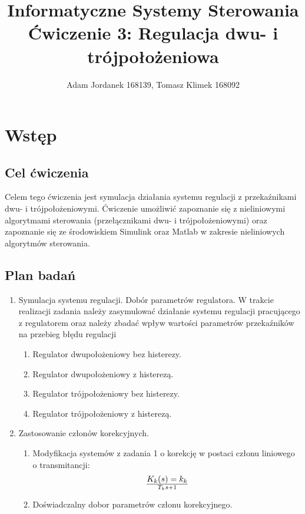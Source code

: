 \documentclass[a4paper,10pt]{article}
\title{Informatyczne Systemy Sterowania \\ \large Ćwiczenie 3: Regulacja dwu- i trójpołożeniowa}
\author{Adam Jordanek 168139, Tomasz Klimek 168092}
\begin{document}
\maketitle

\section{Wstęp}\label{sec:wstęp}
\subsection{Cel ćwiczenia}
Celem tego ćwiczenia jest symulacja działania systemu regulacji z przekaźnikami dwu- i trójpołożeniowymi. Ćwiczenie umożliwić zapoznanie się z nieliniowymi algorytmami sterowania (przełącznikami dwu- i trójpołożeniowymi) oraz zapoznanie się ze środowiskiem Simulink oraz Matlab w zakresie nieliniowych algorytmów sterowania.

\subsection{Plan badań} 
\begin{enumerate}
	\item Symulacja systemu regulacji. Dobór parametrów regulatora. \newline
	 \small {W trakcie realizacji zadania należy zasymulować działanie systemu regulacji pracującego z regulatorem oraz należy zbadać wpływ wartości parametrów przekaźników na przebieg błędu regulacji}
	\begin{enumerate}
		\item Regulator dwupołożeniowy bez histerezy.
		\item Regulator dwupołożeniowy z histerezą.
		\item Regulator trójpołożeniowy bez histerezy.
		\item Regulator trójpołożeniowy z histerezą.
 	\end{enumerate}
	\item Zastosowanie członów korekcyjnych.
	\begin{enumerate}
		\item Modyfikacja systemów z zadania 1 o korekcję w postaci członu liniowego o transmitancji: 
			\begin{equation} \label{eqn:czlonKorekcyjny}
				K_{k}(s) = {k_{k}} \over {T_{k}s+1}
			\end{equation}
		\item Doświadczalny dobor parametrów członu korekcyjnego.
	\end{enumerate}
\end{enumerate}
\end{document}
